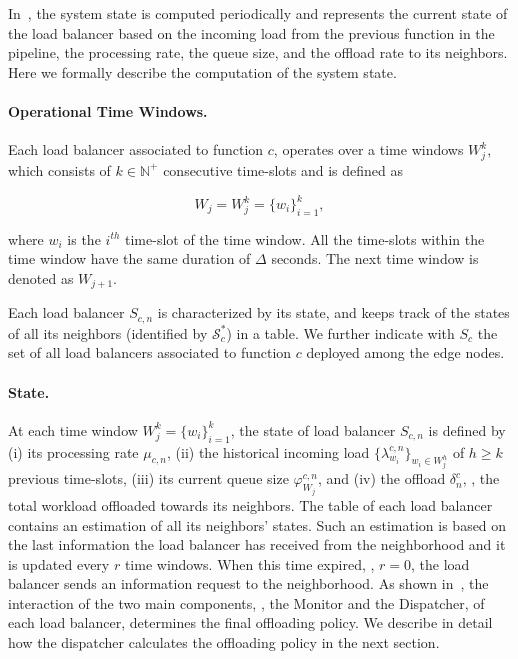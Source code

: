 In~\videojam{}, the system state is computed periodically and represents the current state of the load balancer based on the incoming load from the previous function in the pipeline, the processing rate, the queue size, and the offload rate to its neighbors. Here we formally describe the computation of the system state.

\paragraph{Operational Time Windows.} Each load balancer associated to function $c$, operates over a time windows $W^k_j$, which consists of $k \in \mathbb{N}^+$ consecutive time-slots and is defined as

\begin{equation*}
    W_{j} = W^k_{j} = \{w_i\}^k_{i=1},
\end{equation*}

where $w_i$ is the $i^{th}$ time-slot of the time window. All the time-slots within the time window have the same duration of $\Delta$ seconds. The next time window is denoted as $W_{j+1}$.

Each load balancer $S_{c,n}$ is characterized by its state, and keeps track of the states of all its neighbors (identified by $\mathcal{S}^*_{c}$) in a table. We further indicate with $S_{c}$ the set of all load balancers associated to function $c$ deployed among the edge nodes. 

\paragraph{State.} At each time window $W^k_{j} = \{w_i\}^k_{i=1}$, the state of load balancer $S_{c,n}$ is defined by (i) its processing rate $\mu_{c,n}$, (ii) the historical incoming load $\{\lambda^{c,n}_{w_i}\}_{w_i \in W^h_j}$ of $h \ge k$ previous time-slots, (iii) its current queue size $\varphi^{c,n}_{W_j}$, and (iv) the offload $\delta^c_n$, \ie, the total workload offloaded towards its neighbors. The table of each load balancer contains an estimation of all its neighbors' states. Such an estimation is based on the last information the load balancer has received from the neighborhood and it is updated every $r$ time windows. When this time expired, \ie, $r=0$, the load balancer sends an information request to the neighborhood. As shown in~, the interaction of the two main components, \ie, the Monitor and the Dispatcher, of each load balancer, determines the final offloading policy. We describe in detail how the dispatcher calculates the offloading policy in the next section.

